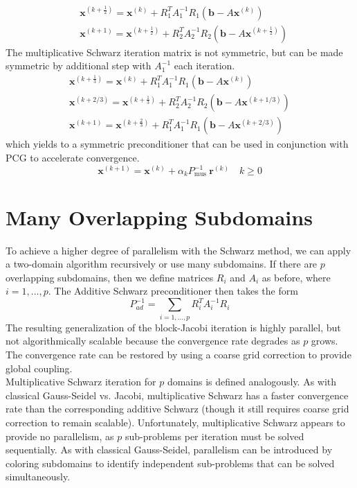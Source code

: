 \documentclass[11pt]{book}
\begin{document}
$$
\begin{aligned}
& \mathbf{x}^{\left(k+\frac{1}{2}\right)}=\mathbf{x}^{(k)}+R_{1}^{T} A_{1}^{-1} R_{1}\left(\mathbf{b}-A \mathbf{x}^{(k)}\right) \\
& \mathbf{x}^{(k+1)}=\mathbf{x}^{\left(k+\frac{1}{2}\right)}+R_{2}^{T} A_{2}^{-1} R_{2}\left(\mathbf{b}-A \mathbf{x}^{\left(k+\frac{1}{2}\right)}\right)
\end{aligned}
$$
The multiplicative Schwarz iteration matrix is not symmetric, but can be made symmetric by additional step with $A_{1}^{-1}$ each iteration.
$$
\begin{gathered}
\mathbf{x}^{\left(k+\frac{1}{3}\right)}=\mathbf{x}^{(k)}+R_{1}^{T} A_{1}^{-1} R_{1}\left(\mathbf{b}-A \mathbf{x}^{(k)}\right) \\
\mathbf{x}^{(k+2 / 3)}=\mathbf{x}^{\left(k+\frac{1}{3}\right)}+R_{2}^{T} A_{2}^{-1} R_{2}\left(\mathbf{b}-A \mathbf{x}^{(k+1 / 3)}\right) \\
\mathbf{x}^{(k+1)}=\mathbf{x}^{\left(k+\frac{2}{3}\right)}+R_{1}^{T} A_{1}^{-1} R_{1}\left(\mathbf{b}-A \mathbf{x}^{(k+2 / 3)}\right)
\end{gathered}
$$
which yields to a symmetric preconditioner that can be used in conjunction with PCG to accelerate convergence.
$$
\mathbf{x}^{(k+1)}=\mathbf{x}^{(k)}+\alpha_{k} P_{\text {mus }}^{-1} \mathbf{r}^{(k)} \quad k \geq 0
$$

\section*{Many Overlapping Subdomains}
To achieve a higher degree of parallelism with the Schwarz method, we can apply a two-domain algorithm recursively or use many subdomains. If there are $p$ overlapping subdomains, then we define matrices $R_{i}$ and $A_{i}$ as before, where $i=1, \ldots, p$. The Additive Schwarz preconditioner then takes the form $$P_{a d}^{-1}=\sum_{i=1, \ldots, p} R_{i}^{T} A_{i}^{-1} R_{i}$$
The resulting generalization of the block-Jacobi iteration is highly parallel, but not algorithmically scalable because the convergence rate degrades as $p$ grows. The convergence rate can be restored by using a coarse grid correction to provide global coupling. \\
Multiplicative Schwarz iteration for $p$ domains is defined analogously. As with classical Gauss-Seidel vs. Jacobi, multiplicative Schwarz has a faster convergence rate than the corresponding additive Schwarz (though it still requires coarse grid correction to remain scalable). Unfortunately, multiplicative Schwarz appears to provide no parallelism, as $p$ sub-problems per iteration must be solved sequentially. As with classical Gauss-Seidel, parallelism can be introduced by coloring subdomains to identify independent sub-problems that can be solved simultaneously.
\end{document}
